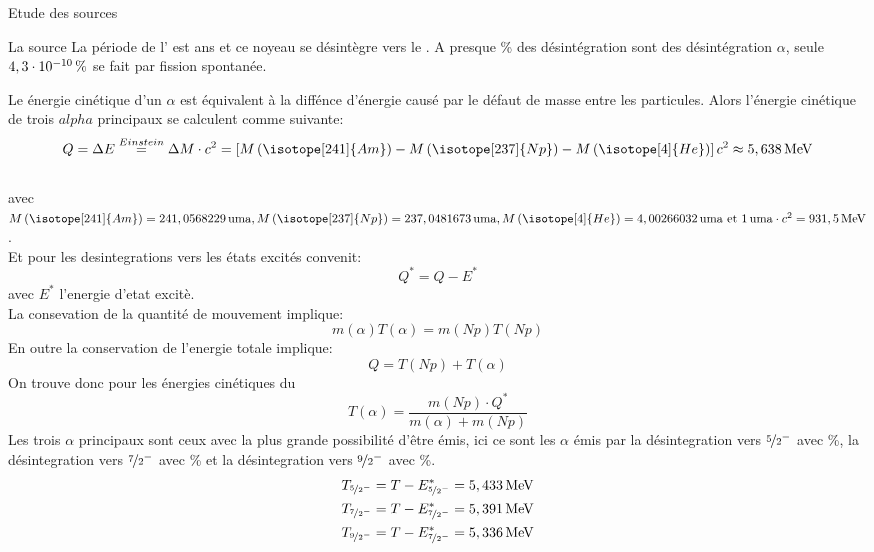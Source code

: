 \documentclass[a4paper,11pt]{scrartcl}
\begin{document}
 \begin{section}{Etude des sources}
  \begin{subsection}{La source }
   La période de l' est \unit[432,6]{ans} et ce noyeau se désintègre vers le . A presque \unit[100]{\%} des désintégration sont des désintégration $\alpha$, seule $\unit[4,3\cdot10^{-10}]{\%}$ 
   se fait par fission spontanée.  


   Le énergie cinétique d'un $\alpha$ est équivalent à la diffénce d'énergie causé par le défaut de masse entre les particules. Alors l'énergie cinétique de trois $alpha$ principaux se calculent comme suivante:
   \begin{equation*}
    Q=\Delta E\stackrel{Einstein}{=}\Delta M\cdot c^2=\left[M\left(\isotope[241]{Am}\right)-M\left(\isotope[237]{Np}\right)-M\left(\isotope[4]{He}\right)\right]c^2\approx\unit[5,638]{MeV}
   \end{equation*}
\\
   avec $M\left(\isotope[241]{Am}\right)=\unit[241,0568229]{uma},M\left(\isotope[237]{Np}\right)=\unit[237,0481673]{uma}, \\ M\left(\isotope[4]{He}\right)=\unit[4,00266032]{uma}\text{ et }\unit[1]{uma}\cdot c^2=\unit[931,5]{MeV}$.\\
Et pour les desintegrations vers les états excités convenit:
\begin{equation*}
Q^{\ast}=Q-E^{\ast}
  \end{equation*}
avec $E^{\ast}$ l'energie d'etat excitè.\\
La consevation de la quantité de mouvement implique:
\begin{equation*}
m(\alpha)T(\alpha)=m(Np)T(Np)
  \end{equation*}
En outre la conservation de l'energie totale implique:
\begin{equation*}
Q=T(Np)+T(\alpha)
  \end{equation*}
On trouve donc pour les énergies cinétiques du    
\begin{equation*}
T(\alpha)=\frac{m(Np)\cdot Q^{\ast}}{m(\alpha)+m(Np)}
  \end{equation*}
   Les trois $\alpha$ principaux sont ceux avec la plus grande possibilité d'être émis, ici ce sont les $\alpha$ émis par la désintegration vers  $\nicefrac{5}{2}^-$ avec \unit[84,85]{\%}, la désintegration vers  $\nicefrac{7}{2}^-$ avec \unit[13,23]{\%} et la désintegration vers  $\nicefrac{9}{2}^-$ avec \unit[1,66]{\%}.
   \begin{eqnarray*}
    T_{\nicefrac{5}{2}^-}=T-E^*_{\nicefrac{5}{2}^-}=\unit[5,433]{MeV}\\
    T_{\nicefrac{7}{2}^-}=T-E^*_{\nicefrac{7}{2}^-}=\unit[5,391]{MeV}\\
    T_{\nicefrac{9}{2}^-}=T-E^*_{\nicefrac{7}{2}^-}=\unit[5,336]{MeV}
   \end{eqnarray*}
  \end{subsection}
 

\end{section}
\end{document}
